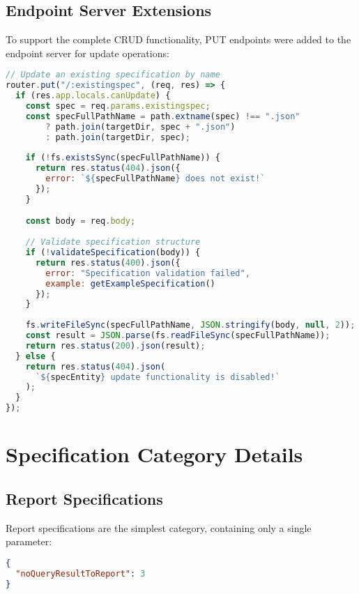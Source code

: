 \documentclass[11pt,a4paper]{article}
\begin{document}
\subsection{Endpoint Server Extensions}

To support the complete CRUD functionality, PUT endpoints were added to the endpoint server for update operations:

\begin{lstlisting}[language=JavaScript, caption=PUT Endpoint Implementation]
// Update an existing specification by name
router.put("/:existingspec", (req, res) => {
  if (res.app.locals.canUpdate) {
    const spec = req.params.existingspec;
    const specFullPathName = path.extname(spec) !== ".json"
        ? path.join(targetDir, spec + ".json")
        : path.join(targetDir, spec);
    
    if (!fs.existsSync(specFullPathName)) {
      return res.status(404).json({ 
        error: `${specFullPathName} does not exist!` 
      });
    }

    const body = req.body;
    
    // Validate specification structure
    if (!validateSpecification(body)) {
      return res.status(400).json({
        error: "Specification validation failed",
        example: getExampleSpecification()
      });
    }
    
    fs.writeFileSync(specFullPathName, JSON.stringify(body, null, 2));
    const result = JSON.parse(fs.readFileSync(specFullPathName));
    return res.status(200).json(result);
  } else {
    return res.status(404).json(
      `${specEntity} update functionality is disabled!`
    );
  }
});
\end{lstlisting}

\section{Specification Category Details}

\subsection{Report Specifications}

Report specifications are the simplest category, containing only a single parameter:

\begin{lstlisting}[language=JSON, caption=Report Specification Example]
{
  "noQueryResultToReport": 3
}
\end{lstlisting}
\end{document}
